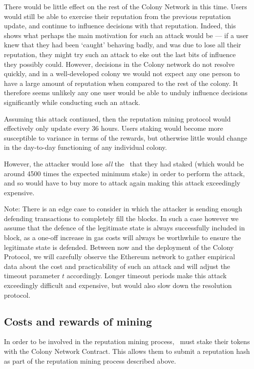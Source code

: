 There would be little effect on the rest of the Colony Network in this time. Users would still be able to exercise their reputation from the previous reputation update, and continue to influence decisions with that reputation. Indeed, this shows what perhaps the main motivation for such an attack would be --- if a user knew that they had been `caught' behaving badly, and was due to lose all their reputation, they might try such an attack to eke out the last bits of influence they possibly could. However, decisions in the Colony network do not resolve quickly, and in a well-developed colony we would not expect any one person to have a large amount of reputation when compared to the rest of the colony. It therefore seems unlikely any one user would be able to unduly influence decisions significantly while conducting such an attack.

Assuming this attack continued, then the reputation mining protocol would effectively only update every 36 hours. Users staking would become more susceptible to variance in terms of the rewards, but otherwise little would change in the day-to-day functioning of any individual colony.

However, the attacker would lose \emph{all} the \rct\ that they had staked (which would be around 4500 times the expected minimum stake) in order to perform the attack, and so would have to buy more to attack again making this attack exceedingly expensive.


Note: There is an edge case to consider in which the attacker is sending enough defending transactions to completely fill the blocks. In such a case however we assume that the defence of the legitimate state is always successfully included in block, as a one-off increase in gas costs will always be worthwhile to ensure the legitimate state is defended. Between now and the deployment of the Colony Protocol, we will carefully observe the Ethereum network to gather empirical data about the cost and practicability of such an attack and will adjust the timeout parameter $t$ accordingly. Longer timeout periods make this attack exceedingly difficult and expensive, but would also slow down the resolution protocol.

\subsection{Costs and rewards of mining}\label{subsec:mining-costs-and-rewards}
In order to be involved in the reputation mining process, \rcths\ must stake their tokens with the Colony Network Contract. This allows them to submit a reputation hash as part of the reputation mining process described above.

